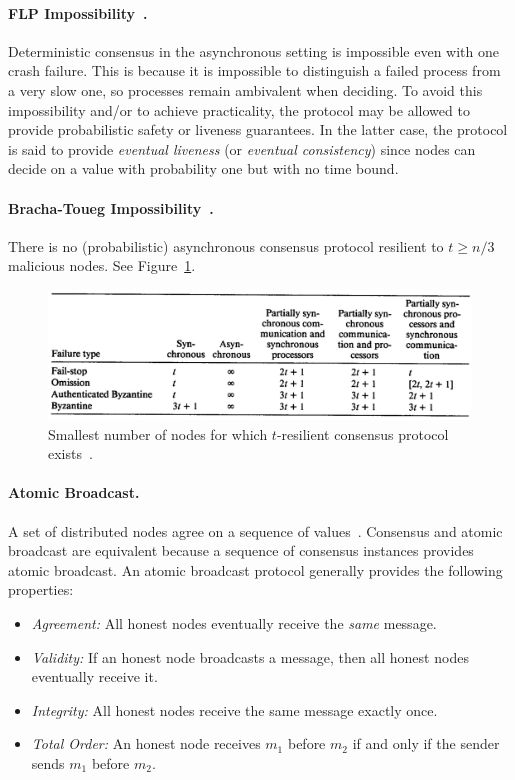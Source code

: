 \documentclass[11pt]{article}
\theoremstyle{mytheoremstyle}
\begin{document}
\paragraph{FLP Impossibility~\cite{FLP}.} Deterministic consensus in the asynchronous setting is impossible even with one crash failure. This is because it is impossible to distinguish a failed process from a very slow one, so processes remain ambivalent when deciding. To avoid this impossibility and/or to achieve practicality, the protocol may be allowed to provide probabilistic safety or liveness guarantees. In the latter case, the protocol is said to provide \emph{eventual liveness} (or \emph{eventual consistency}) since nodes can decide on a value with probability one but with no time bound.

\paragraph{Bracha-Toueg Impossibility~\cite{Bracha:Toueg:1983}.} There is no (probabilistic) asynchronous consensus protocol resilient to $t \geq n/3$ malicious nodes. See Figure~\ref{fig:bounds}.

\begin{figure}
	\centering
	\includegraphics[width=0.9\linewidth]{bounds}
	\caption{Smallest number of nodes for which $t$-resilient consensus protocol exists~\cite{dwork:1988:cpp}.}
	\label{fig:bounds}
\end{figure}

\paragraph{Atomic Broadcast.}
A set of distributed nodes agree on a sequence of values~\cite{AtomicBroadcast:1993}. Consensus and atomic broadcast are equivalent because a sequence of consensus instances provides atomic broadcast. An atomic broadcast protocol generally provides the following properties:
\begin{itemize}
	\item \textit{Agreement:} All honest nodes eventually receive the \emph{same} message.
	\item \textit{Validity:} If an honest node broadcasts a message, then all honest nodes eventually receive it.
	\item \textit{Integrity:} All honest nodes receive the same message exactly once.
	\item \textit{Total Order:} An honest node receives $m_1$ before $m_2$ if and only if the sender sends $m_1$ before $m_2$.
\end{itemize}
\end{document}
